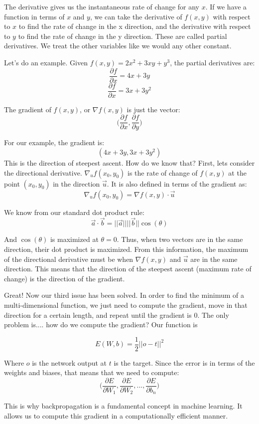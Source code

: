 \documentclass{article}
\begin{document}
The derivative gives us the instantaneous rate of change for any $x$. If we have a function in terms of $x$ and $y$, we can take the derivative of $f(x, y)$ with respect to $x$ to find the rate of change in the x direction, and the derivative with respect to $y$ to find the rate of change in the y direction. These are called partial derivatives. We treat the other variables like we would any other constant.

Let's do an example. Given $f(x, y) = 2x^2 + 3xy + y^3$, the partial derivatives are:
\[\frac{\partial f}{\partial x} = 4x + 3y\]
\[\frac{\partial f}{\partial x} = 3x + 3y^2\]

The gradient of $f(x, y)$, or $\nabla f(x, y)$ is just the vector:
\[\big(\frac{\partial f}{\partial x}, \frac{\partial f}{\partial y}\big)\]

For our example, the gradient is:
\[(4x + 3y,3x + 3y^2)\]
This is the direction of steepest ascent. How do we know that?
First, lets consider the directional derivative. $\nabla_u f(x_0, y_0)$ is the rate of change of $f(x, y)$ at the point $(x_0, y_0)$ in the direction $\vec u$. It is also defined in terms of the gradient as:
\[\nabla_u f(x_0, y_0) = \nabla f(x, y) \cdot \vec u\]

We know from our standard dot product rule:
\[\vec a \cdot \vec b = ||\vec a ||||\vec b||\cos(\theta)\]

And $\cos(\theta)$ is maximized at $\theta = 0$. Thus, when two vectors are in the same direction, their dot product is maximized. From this information, the maximum of the directional derivative must be when $\nabla f(x, y)$ and $\vec u$ are in the same direction. This means that the direction of the steepest ascent (maximum rate of change) is the direction of the gradient.

Great! Now our third issue has been solved. In order to find the minimum of a multi-dimensional function, we just need to compute the gradient, move in that direction for a certain length, and repeat until the gradient is 0. The only problem is.... how do we compute the gradient? Our function is

\[E(W, b) = \frac{1}{2}||o-t||^2\]

Where $o$ is the network output at $t$ is the target. Since the error is in terms of the weights and biases, that means that we need to compute:
\[\big(\frac{\partial E}{\partial W_1}, \frac{\partial E}{\partial W_2}, ..., \frac{\partial E}{\partial b_n}\big)\]

This is why backpropagation is a fundamental concept in machine learning. It allows us to compute this gradient in a computationally efficient manner.
\end{document}
